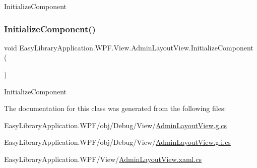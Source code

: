 Initialize\+Component 

\mbox{\label{class_easy_library_application_1_1_w_p_f_1_1_view_1_1_admin_layout_view_a5c3a4a61e8a25227899483a51c38e5bc}} 
\subsubsection{\texorpdfstring{Initialize\+Component()}{InitializeComponent()}\hspace{0.1cm}{\footnotesize\ttfamily [4/4]}}
{\footnotesize\ttfamily void Easy\+Library\+Application.\+W\+P\+F.\+View.\+Admin\+Layout\+View.\+Initialize\+Component (\begin{DoxyParamCaption}{ }\end{DoxyParamCaption})}



Initialize\+Component 



The documentation for this class was generated from the following files\+:\begin{DoxyCompactItemize}
\item 
Easy\+Library\+Application.\+W\+P\+F/obj/\+Debug/\+View/\mbox{\hyperlink{_debug_2_view_2_admin_layout_view_8g_8cs}{Admin\+Layout\+View.\+g.\+cs}}\item 
Easy\+Library\+Application.\+W\+P\+F/obj/\+Debug/\+View/\mbox{\hyperlink{_admin_layout_view_8g_8i_8cs}{Admin\+Layout\+View.\+g.\+i.\+cs}}\item 
Easy\+Library\+Application.\+W\+P\+F/\+View/\mbox{\hyperlink{_admin_layout_view_8xaml_8cs}{Admin\+Layout\+View.\+xaml.\+cs}}\end{DoxyCompactItemize}

